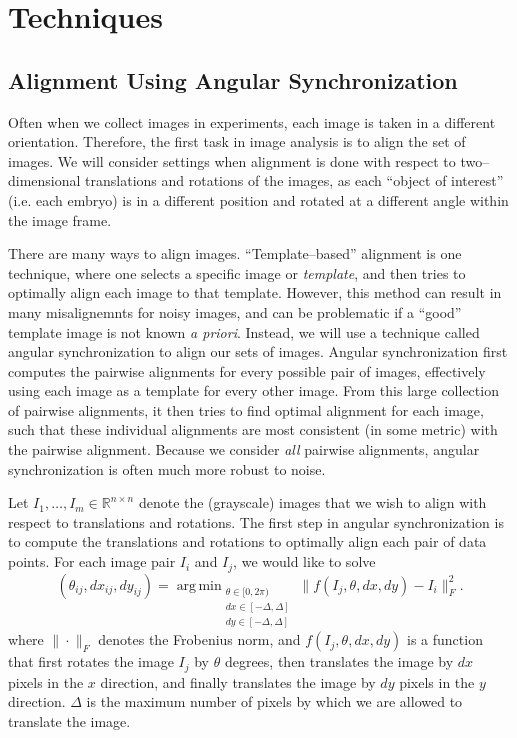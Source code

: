 \documentclass[11pt]{article}
\DeclareMathOperator*{\argmin}{arg\,min}
\begin{document}
\section{Techniques}

\subsection{Alignment Using Angular Synchronization}

Often when we collect images in experiments, each image is taken in a different orientation. 
%
Therefore, the first task in image analysis is to align the set of images. 
%
We will consider settings when alignment is done with respect to two--dimensional translations and rotations of the images, as each ``object of interest'' (i.e. each embryo) is in a different position and rotated at a different angle within the image frame. 

There are many ways to align images. 
%
``Template--based'' alignment \cite{ahuja2007template} is one technique, where one selects a specific image or {\em template}, and then tries to optimally align each image to that template.
%
However, this method can result in many misalignemnts for noisy images, and can be problematic if a ``good'' template image is not known {\em a priori}. 
%
Instead, we will use a technique called angular synchronization\cite{singer2011angular} to align our sets of images.
%
Angular synchronization first computes the pairwise alignments for every possible pair of images, effectively using each image as a template for every other image.
%
From this large collection of pairwise alignments, it then tries to find optimal alignment for each image, such that these individual alignments are most consistent (in some metric) with the pairwise alignment.
%
Because we consider {\em all} pairwise alignments, angular synchronization is often much more robust to noise. 

Let $I_1, \dots, I_m \in \mathbb{R}^{n \times n}$ denote the (grayscale) images that we wish to align with respect to translations and rotations.
%
The first step in angular synchronization is to compute the translations and rotations to optimally align each pair of data points. 
%
For each image pair $I_i$ and $I_j$, we would like to solve
\begin{equation}\label{eq:opt_pairwise}
(\theta_{ij}, dx_{ij}, dy_{ij}) = \argmin_{
\begin{matrix}
\theta \in [0, 2\pi) \\ 
dx \in [-\Delta, \Delta]\\ 
dy \in [-\Delta, \Delta]
\end{matrix}
} \|f(I_j, \theta, dx, dy) - I_i \|_F^2.
\end{equation}
where $\| \cdot \|_F$ denotes the Frobenius norm, and $f(I_j, \theta, dx, dy)$ is a function that first rotates the image $I_j$ by $\theta$ degrees, then translates the image by $dx$ pixels in the $x$ direction, and finally translates the image by $dy$ pixels in the $y$ direction. 
%
$\Delta$ is the maximum number of pixels by which we are allowed to translate the image.
\end{document}
